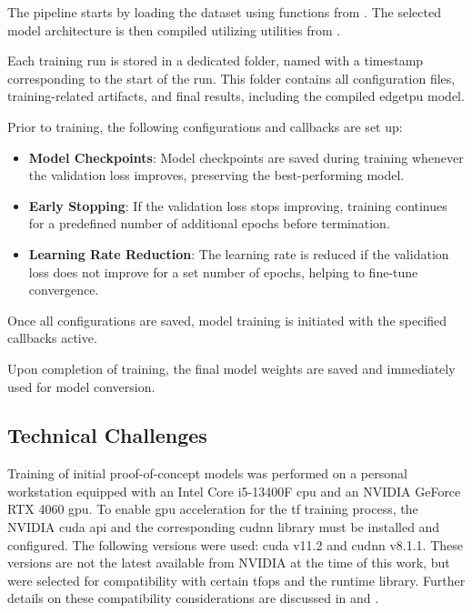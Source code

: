 {The pipeline starts by loading the dataset using functions from .
The selected model architecture is then compiled utilizing utilities from .

Each training run is stored in a dedicated folder, named with a timestamp corresponding to the start of the run.
This folder contains all configuration files, training-related artifacts, and final results, including the compiled \gls{edgetpu} model.

Prior to training, the following configurations and callbacks are set up:

\begin{itemize}
\item \textbf{Model Checkpoints}: Model checkpoints are saved during training whenever the validation loss improves, preserving the best-performing model.
\item \textbf{Early Stopping}: If the validation loss stops improving, training continues for a predefined number of additional epochs before termination.
\item \textbf{Learning Rate Reduction}: The learning rate is reduced if the validation loss does not improve for a set number of epochs, helping to fine-tune convergence.
\end{itemize}

Once all configurations are saved, model training is initiated with the specified callbacks active.

Upon completion of training, the final model weights are saved and immediately used for model conversion.

\subsection*{Technical Challenges}

Training of initial proof-of-concept models was performed on a personal workstation equipped with an Intel Core i5-13400F \gls{cpu} and an NVIDIA GeForce RTX 4060 \gls{gpu}.
To enable \gls{gpu} acceleration for the \gls{tf} training process, the NVIDIA \gls{cuda} \gls{api} and the corresponding \gls{cudnn} library must be installed and configured.
The following versions were used: \gls{cuda} v11.2 and \gls{cudnn} v8.1.1.
These versions are not the latest available from NVIDIA at the time of this work, but were selected for compatibility with certain \glspl{tfop} and the  runtime library.
Further details on these compatibility considerations are discussed in  and .

}
